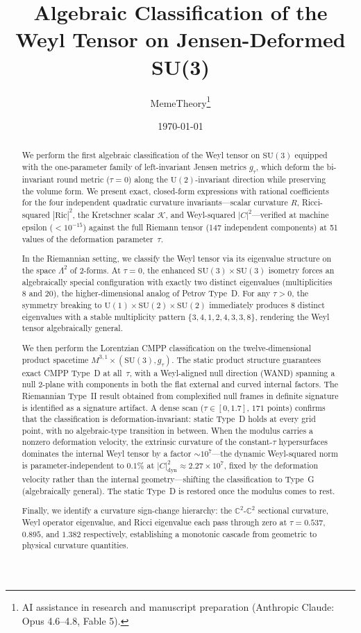 \documentclass[12pt]{article}
\title{Algebraic Classification of the Weyl Tensor on Jensen-Deformed SU(3)}
\author{MemeTheory\thanks{AI assistance in research and manuscript preparation (Anthropic Claude: Opus 4.6--4.8, Fable 5).}}
\date{\today}
\theoremstyle{definition}
\theoremstyle{remark}
\begin{document}
\maketitle

\begin{abstract}
We perform the first algebraic classification of the Weyl tensor on $\mathrm{SU}(3)$ equipped with the one-parameter family of left-invariant Jensen metrics $g_\tau$, which deform the bi-invariant round metric ($\tau=0$) along the $\mathrm{U}(2)$-invariant direction while preserving the volume form.
We present exact, closed-form expressions with rational coefficients for the four independent quadratic curvature invariants---scalar curvature $R$, Ricci-squared $|\mathrm{Ric}|^2$, the Kretschner scalar $\mathcal{K}$, and Weyl-squared $|C|^2$---verified at machine epsilon ($<10^{-15}$) against the full Riemann tensor (147 independent components) at 51 values of the deformation parameter~$\tau$.

In the Riemannian setting, we classify the Weyl tensor via its eigenvalue structure on the space $\Lambda^2$ of 2-forms.  At $\tau=0$, the enhanced $\mathrm{SU}(3)\times\mathrm{SU}(3)$ isometry forces an algebraically special configuration with exactly two distinct eigenvalues (multiplicities 8 and 20), the higher-dimensional analog of Petrov Type~D.  For any $\tau>0$, the symmetry breaking to $\mathrm{U}(1)\times\mathrm{SU}(2)\times\mathrm{SU}(2)$ immediately produces 8 distinct eigenvalues with a stable multiplicity pattern $\{3,4,1,2,4,3,3,8\}$, rendering the Weyl tensor algebraically general.

We then perform the Lorentzian CMPP classification on the twelve-dimensional product spacetime $M^{3,1}\times(\mathrm{SU}(3),g_\tau)$.  The static product structure guarantees exact CMPP Type~D at all~$\tau$, with a Weyl-aligned null direction (WAND) spanning a null 2-plane with components in both the flat external and curved internal factors.  The Riemannian Type~II result obtained from complexified null frames in definite signature is identified as a signature artifact.  A dense scan ($\tau\in[0,1.7]$, $171$ points) confirms that the classification is deformation-invariant: static Type~D holds at every grid point, with no algebraic-type transition in between.  When the modulus carries a nonzero deformation velocity, the extrinsic curvature of the constant-$\tau$ hypersurfaces dominates the internal Weyl tensor by a factor $\sim\!10^7$---the dynamic Weyl-squared norm is parameter-independent to $0.1\%$ at $|C|^2_{\mathrm{dyn}}\approx2.27\times10^7$, fixed by the deformation velocity rather than the internal geometry---shifting the classification to Type~G (algebraically general).  The static Type~D is restored once the modulus comes to rest.

Finally, we identify a curvature sign-change hierarchy: the $\mathbb{C}^2$-$\mathbb{C}^2$ sectional curvature, Weyl operator eigenvalue, and Ricci eigenvalue each pass through zero at $\tau=0.537$, $0.895$, and $1.382$ respectively, establishing a monotonic cascade from geometric to physical curvature quantities.
\end{abstract}
\end{document}
